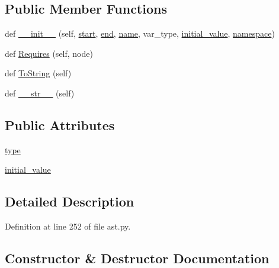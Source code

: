 \subsection*{Public Member Functions}
\begin{DoxyCompactItemize}
\item 
def \hyperlink{classcpp_1_1ast_1_1VariableDeclaration_adc19909b6a3b2c2978b02044634fc13f}{\+\_\+\+\_\+init\+\_\+\+\_\+} (self, \hyperlink{classcpp_1_1ast_1_1Node_a7b2aa97e6a049bb1a93aea48c48f1f44}{start}, \hyperlink{classcpp_1_1ast_1_1Node_a3c5e5246ccf619df28eca02e29d69647}{end}, \hyperlink{classcpp_1_1ast_1_1__GenericDeclaration_af774f4729dfd78d0538a6782fe8514c1}{name}, var\+\_\+type, \hyperlink{classcpp_1_1ast_1_1VariableDeclaration_a7c259ca42a06e264679e8ab66e7ea374}{initial\+\_\+value}, \hyperlink{classcpp_1_1ast_1_1__GenericDeclaration_a8aee3f11b37449d54b42a78e0a689f46}{namespace})
\item 
def \hyperlink{classcpp_1_1ast_1_1VariableDeclaration_aaa1cae7cf191e6d561d861cd053a0bf4}{Requires} (self, node)
\item 
def \hyperlink{classcpp_1_1ast_1_1VariableDeclaration_a047aa4afddf7b7823a4095cea9477a21}{To\+String} (self)
\item 
def \hyperlink{classcpp_1_1ast_1_1VariableDeclaration_a9f5c15731d1bdd8fe14c2a575e2f4fe6}{\+\_\+\+\_\+str\+\_\+\+\_\+} (self)
\end{DoxyCompactItemize}
\subsection*{Public Attributes}
\begin{DoxyCompactItemize}
\item 
\hyperlink{classcpp_1_1ast_1_1VariableDeclaration_a8c7cc8578ea12f93c6e1c5c6ef4ddf99}{type}
\item 
\hyperlink{classcpp_1_1ast_1_1VariableDeclaration_a7c259ca42a06e264679e8ab66e7ea374}{initial\+\_\+value}
\end{DoxyCompactItemize}


\subsection{Detailed Description}


Definition at line 252 of file ast.\+py.



\subsection{Constructor \& Destructor Documentation}
\mbox{\label{classcpp_1_1ast_1_1VariableDeclaration_adc19909b6a3b2c2978b02044634fc13f}} 
